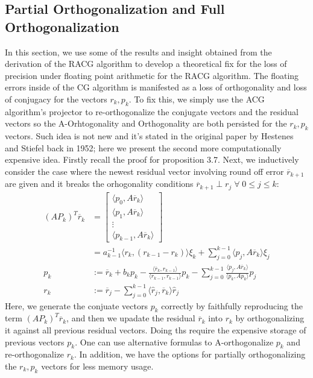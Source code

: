 \documentclass[]{article}
\theoremstyle{definition}
\begin{document}
    \subsection{Partial Orthogonalization and Full Orthogonalization}
        In this section, we use some of the results and insight obtained from the derivation of the RACG algorithm to develop a theoretical fix for the loss of precision under floating point arithmetic for the RACG algorithm. The floating errors inside of the CG algorithm is manifested as a loss of orthogonality and loss of conjugacy for the vectors $r_k, p_k$. To fix this, we simply use the ACG algorithm's projector to re-orthogonalize the conjugate vectors and the residual vectors so the A-Orhtogonality and Orthogonality are both persisted for the $r_k, p_k$ vectors. Such idea is not new and it's stated in the original paper by Hestenes and Stiefel back in 1952; here we present the second more computationally expensive idea. Firstly recall the proof for proposition 3.7. Next, we inductively consider the case where the newest residual vector involving round off error $\overline{r}_{k + 1}$ are given and it breaks the orhogonality conditions $\overline{r}_{k + 1} \perp r_{j} \; \forall \; 0 \le j \le k$: 
        \begin{align}
            (AP_k)^T\overline{r}_k &= 
            \begin{bmatrix}
                \langle p_0, A\overline{r}_k\rangle
                \\
                \langle p_1, A\overline{r}_k\rangle
                \\
                \vdots
                \\
                \langle p_{k - 1}, A\overline{r}_k\rangle
            \end{bmatrix}
            \\
            & = 
            a_{k - 1}^{-1}\langle r_k, (r_{k - 1} - r_k)\rangle\xi_k + \sum_{j = 0}^{k - 1}\langle p_j, A\overline{r}_k\rangle \xi_j
            \\
            p_k &:= \overline{r}_k + b_kp_k - 
                \frac{\langle \overline{r}_k, r_{k -1}\rangle}{\langle r_{k - 1}, r_{k - 1}\rangle}p_k
            - \sum_{j = 0}^{k - 1}\frac{\langle p_j, A\overline{r}_k\rangle}{\langle p_k, Ap_k\rangle}p_j
            \\
            r_k &:= \overline{r}_j - \sum_{j = 0}^{k - 1} \langle \hat{r}_j,\overline{r}_k\rangle \hat{r}_j
        \end{align}
        Here, we generate the conjuate vectors $p_k$ correctly by faithfully reproducing the term $(AP_k)^T\overline{r}_k$, and then we upadate the residual $\overline{r}_k$ into $r_k$ by orthogonalizing it against all previous residual vectors. Doing ths require the expensive storage of previous vectors $p_k$. One can use alternative formulas to A-orthogonalize $p_k$ and re-orthogonalize $r_k$. In addition, we have the options for partially orthogonalizing the $r_k, p_k$ vectors for less memory usage. 
\end{document}
